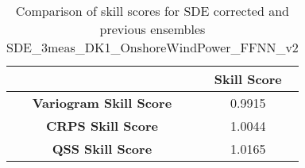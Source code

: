 
        \begin{table}[h!]
            \centering
            \begin{tabular}{|c|c|}
                \hline
                & \textbf{Skill Score}  \\
                \hline
                \textbf{Variogram Skill Score} & 0.9915  \\
                \hline
                \textbf{CRPS Skill Score} & 1.0044  \\
                \hline
                \textbf{QSS Skill Score} & 1.0165 \\
                \hline
            \end{tabular}
            \caption{Comparison of skill scores for SDE corrected and previous ensembles SDE_3meas_DK1_OnshoreWindPower_FFNN_v2}
            \label{table:skill_scores_comparison}
        \end{table}
        